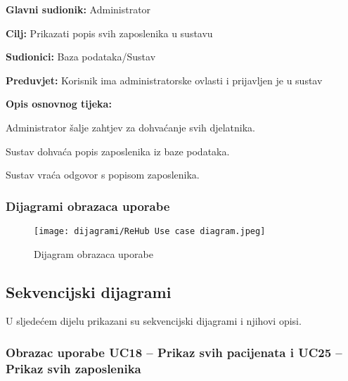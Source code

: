                 \noindent {}
					\begin{packed_item}
	
						\item \textbf{Glavni sudionik: }Administrator
						\item  \textbf{Cilj:} Prikazati popis svih zaposlenika u sustavu
						\item  \textbf{Sudionici:} Baza podataka/Sustav
						\item  \textbf{Preduvjet:} Korisnik ima administratorske ovlasti i prijavljen je u sustav
						\item  \textbf{Opis osnovnog tijeka:}
						
						\item[] \begin{packed_enum}
	
							\item Administrator šalje zahtjev za dohvaćanje svih djelatnika.
							\item Sustav dohvaća popis zaposlenika iz baze podataka.
                            \item Sustav vraća odgovor s popisom zaposlenika.
	
						\end{packed_enum}
						
						
					\end{packed_item}
     
				\subsubsection{Dijagrami obrazaca uporabe}
					
					\begin{figure}[H]
			         \texttt{[image: dijagrami/ReHub Use case diagram.jpeg]}
			         \centering
			         \caption{Dijagram obrazaca uporabe}
			         \label{fig:UseCaseDiagram}
		          \end{figure}
				\eject		
				
			\subsection{Sekvencijski dijagrami}
				
				U sljedećem dijelu prikazani su sekvencijski dijagrami i njihovi opisi.
                \subsubsection{Obrazac uporabe UC18 – Prikaz svih pacijenata i UC25 – Prikaz svih zaposlenika}

